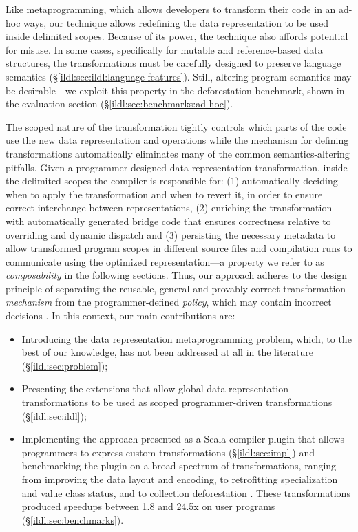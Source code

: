 Like metaprogramming, which allows developers to transform their code in an ad-hoc ways, our technique allows redefining the data representation to be used inside delimited scopes. Because of its power, the technique also affords potential for misuse. In some cases, specifically for mutable and reference-based data structures, the transformations must be carefully designed to preserve language semantics
(\S\ref{ildl:sec:ildl:language-features}). Still, altering program semantics may be desirable---we exploit this property in the deforestation benchmark, shown in the evaluation section (\S\ref{ildl:sec:benchmarks:ad-hoc}).

The scoped nature of the transformation tightly controls which parts of the code use the new data representation and operations while the mechanism for defining transformations automatically eliminates
many of the common semantics-altering pitfalls. Given a programmer-designed data representation transformation, inside the delimited scopes the compiler is responsible for: (1) automatically deciding when to apply the transformation and when to revert it, in order to ensure correct interchange between representations, (2) enriching the transformation with automatically generated bridge code that ensures correctness relative to overriding and dynamic dispatch and (3) persisting the necessary metadata to allow transformed program scopes in different source files and compilation runs to communicate using the optimized representation---a property we refer to as \emph{composability} in the following sections. Thus, our approach adheres to the design principle of separating the reusable, general and provably correct transformation \emph{mechanism} from the programmer-defined \emph{policy}, which may contain incorrect decisions \cite{lampson-mechanism-policy}. In this context, our main contributions are:

\begin{itemize}
  \item Introducing the data representation metaprogramming problem, which, to the best of our knowledge, has not been addressed at all in the literature (\S\ref{ildl:sec:problem});
  \item Presenting the extensions that allow global data representation transformations to be used as scoped programmer-driven transformations (\S\ref{ildl:sec:ildl});
  \item Implementing the approach presented as a Scala compiler plugin \cite{ildl-plugin} that allows programmers to express custom transformations (\S\ref{ildl:sec:impl}) and benchmarking the plugin on a broad spectrum of transformations, ranging from improving the data layout and encoding, to retrofitting specialization and value class status, and to collection deforestation \cite{wadler-deforestation}. These transformations produced  speedups between 1.8 and 24.5x on user programs (\S\ref{ildl:sec:benchmarks}).
\end{itemize}
